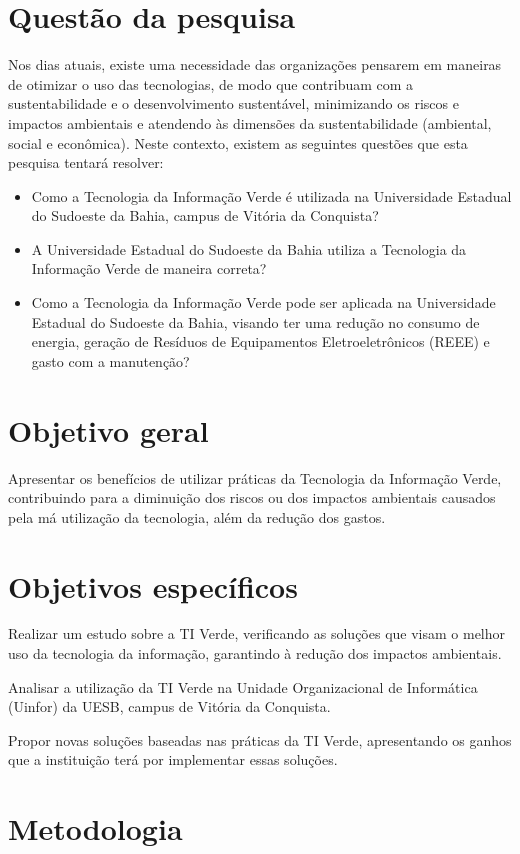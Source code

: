\section{Questão da pesquisa}
Nos dias atuais, existe uma necessidade das organizações pensarem em maneiras de otimizar o uso das tecnologias, de modo que contribuam com a sustentabilidade e o desenvolvimento sustentável, minimizando os riscos e impactos ambientais e atendendo às dimensões da sustentabilidade (ambiental, social e econômica). Neste contexto, existem as seguintes questões que esta pesquisa tentará resolver:
\begin{itemize}
    \item Como a Tecnologia da Informação Verde é utilizada na Universidade Estadual do Sudoeste da Bahia, campus de Vitória da Conquista?
    \item A Universidade Estadual do Sudoeste da Bahia utiliza a Tecnologia da Informação Verde de maneira correta?
    \item Como a Tecnologia da Informação Verde pode ser aplicada na Universidade Estadual do Sudoeste da Bahia, visando ter uma redução no consumo de energia, geração de Resíduos de Equipamentos Eletroeletrônicos (REEE) e gasto com a manutenção?
\end{itemize}

\section{Objetivo geral}
Apresentar os benefícios de utilizar práticas da Tecnologia da Informação Verde, contribuindo para a diminuição dos riscos ou dos impactos ambientais causados pela má utilização da tecnologia, além da redução dos gastos. 

\section{Objetivos específicos}
Realizar um estudo sobre a TI Verde, verificando as soluções que visam o melhor uso da tecnologia da informação, garantindo à redução dos impactos ambientais.
 
Analisar a utilização da TI Verde na Unidade Organizacional de Informática (Uinfor) da UESB, campus de Vitória da Conquista.  

Propor novas soluções baseadas nas práticas da TI Verde, apresentando os ganhos que a instituição terá por implementar essas soluções.


\section{Metodologia}


